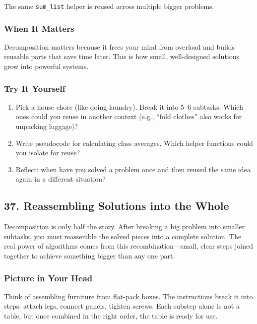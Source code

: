 \documentclass[
  letterpaper,
  DIV=11,
  numbers=noendperiod]{scrreprt}
\providecommand{\tightlist}{%
  \setlength{\itemsep}{0pt}\setlength{\parskip}{0pt}}
\begin{document}
The same \texttt{sum\_list} helper is reused across multiple bigger
problems.

\subsubsection{When It Matters}\label{when-it-matters-33}

Decomposition matters because it frees your mind from overload and
builds reusable parts that save time later. This is how small,
well-designed solutions grow into powerful systems.

\subsubsection{Try It Yourself}\label{try-it-yourself-35}

\begin{enumerate}
\def\labelenumi{\arabic{enumi}.}
\tightlist
\item
  Pick a house chore (like doing laundry). Break it into 5--6 subtasks.
  Which ones could you reuse in another context (e.g., ``fold clothes''
  also works for unpacking luggage)?
\item
  Write pseudocode for calculating class averages. Which helper
  functions could you isolate for reuse?
\item
  Reflect: when have you solved a problem once and then reused the same
  idea again in a different situation?
\end{enumerate}

\subsection{37. Reassembling Solutions into the
Whole}\label{reassembling-solutions-into-the-whole}

Decomposition is only half the story. After breaking a big problem into
smaller subtasks, you must reassemble the solved pieces into a complete
solution. The real power of algorithms comes from this
recombination---small, clear steps joined together to achieve something
bigger than any one part.

\subsubsection{Picture in Your Head}\label{picture-in-your-head-36}

Think of assembling furniture from flat-pack boxes. The instructions
break it into steps: attach legs, connect panels, tighten screws. Each
substep alone is not a table, but once combined in the right order, the
table is ready for use.
\end{document}
